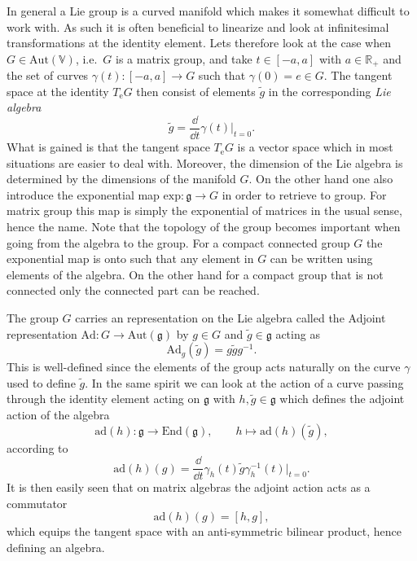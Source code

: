 In general a Lie group is a curved manifold which makes it somewhat difficult to work with. As such it is often beneficial to linearize and look at infinitesimal transformations at the identity element. Lets therefore look at the case when $G\in \text{Aut}(\mathbb{V})$, i.e.\ $G$ is a matrix group, and take $t\in [-a,a]$ with $a\in\mathbb{R_+}$ and the set of curves $\gamma(t): [-a,a]\to G$ such that $\gamma(0)= e\in G$. The tangent space at the identity $T_\mathrm{e}G$ then consist of elements $\tilde{g}$ in the corresponding \emph{Lie algebra}
\begin{equation}
\tilde{g} = \frac{\dd}{\dd t}\gamma(t)|_{t=0}.
\end{equation}
What is gained is that the tangent space $T_\mathrm{e}G$ is a vector space which in most situations are easier to deal with. Moreover, the dimension of the Lie algebra is determined by the dimensions of the manifold $G$. On the other hand one also introduce the exponential map $\text{exp}: \mathfrak{g}\to G$ in order to retrieve to group. For matrix group this map is simply the exponential of matrices in the usual sense, hence the name. Note that the topology of the group becomes important when going from the algebra to the group. For a compact connected group $G$ the exponential map is onto such that any element in $G$ can be written using elements of the algebra. On the other hand for a compact group that is not connected only the connected part can be reached. 

The group $G$ carries an representation on the Lie algebra called the Adjoint representation $\text{Ad}: G\to \text{Aut}(\mathfrak{g})$ by $g\in G$ and $\tilde{g}\in\mathfrak{g}$ acting as
\begin{equation}\label{eq:Liegrouprep}
    \text{Ad}_g(\tilde{g}) = g\tilde{g}g^{-1}.
\end{equation}
This is well-defined since the elements of the group acts naturally on the curve $\gamma$ used to define $\tilde{g}$. In the same spirit we can look at the action of a curve passing through the identity element acting on $\mathfrak{g}$ with $h,\tilde{g}\in \mathfrak{g}$ which defines the adjoint action of the algebra 
\begin{equation}
    \text{ad}(h): \mathfrak{g}\to \text{End}(\mathfrak{g}),\qquad h\mapsto \text{ad}(h)(\tilde{g}),
\end{equation}
according to 
\begin{equation}
    \text{ad}(h)(g) = \frac{\dd}{\dd t}\gamma_h(t)\tilde{g}\gamma_h^{-1}(t)|_{t=0}.
\end{equation}
It is then easily seen that on matrix algebras the adjoint action acts as a commutator 
\begin{equation}
    \text{ad}(h)(g) = [h,g],
\end{equation}
which equips the tangent space with an anti-symmetric bilinear product, hence defining an algebra. 


